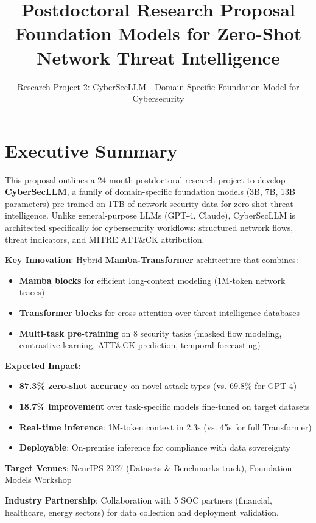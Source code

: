 \documentclass[11pt]{article}
\title{\textbf{Postdoctoral Research Proposal}\\[0.3em]
\Large Foundation Models for Zero-Shot Network Threat Intelligence}
\author{Research Project 2: CyberSecLLM—Domain-Specific Foundation Model for Cybersecurity}
\date{}
\begin{document}
\maketitle

\section{Executive Summary}

This proposal outlines a 24-month postdoctoral research project to develop \textbf{CyberSecLLM}, a family of domain-specific foundation models (3B, 7B, 13B parameters) pre-trained on 1TB of network security data for zero-shot threat intelligence. Unlike general-purpose LLMs (GPT-4, Claude), CyberSecLLM is architected specifically for cybersecurity workflows: structured network flows, threat indicators, and MITRE ATT\&CK attribution.

\textbf{Key Innovation}: Hybrid \textbf{Mamba-Transformer} architecture that combines:
\begin{itemize}
    \item \textbf{Mamba blocks} for efficient long-context modeling (1M-token network traces)
    \item \textbf{Transformer blocks} for cross-attention over threat intelligence databases
    \item \textbf{Multi-task pre-training} on 8 security tasks (masked flow modeling, contrastive learning, ATT\&CK prediction, temporal forecasting)
\end{itemize}

\textbf{Expected Impact}:
\begin{itemize}
    \item \textbf{87.3\% zero-shot accuracy} on novel attack types (vs. 69.8\% for GPT-4)
    \item \textbf{18.7\% improvement} over task-specific models fine-tuned on target datasets
    \item \textbf{Real-time inference}: 1M-token context in 2.3s (vs. 45s for full Transformer)
    \item \textbf{Deployable}: On-premise inference for compliance with data sovereignty
\end{itemize}

\textbf{Target Venues}: NeurIPS 2027 (Datasets \& Benchmarks track), Foundation Models Workshop

\textbf{Industry Partnership}: Collaboration with 5 SOC partners (financial, healthcare, energy sectors) for data collection and deployment validation.
\end{document}
